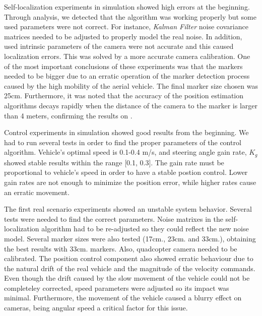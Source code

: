 \documentclass{styles/svproc}
\begin{document}
        Self-localization experiments in simulation showed high errors at the beginning. Through analysis, we detected that the algorithm was working properly but some used parameters were not correct. For instance, \textit{Kalman Filter} noise covariance matrices needed to be adjusted to properly model the real noise. In addition, used intrinsic parameters of the camera were not accurate and this caused localization errors. This was solved by a more accurate camera calibration. One of the most important conclusions of these experiments was that the markers needed to be bigger due to an erratic operation of the marker detection process caused by the high mobility of the aerial vehicle. The final marker size chosen was 25cm. Furthermore, it was noted that the accuracy of the position estimation algorithms decays rapidly when the distance of the camera to the marker is larger than 4 meters, confirming the results on \cite{lopezceron2016}.
	
	Control experiments in simulation showed good results from the beginning. We had to run several tests in order to find the proper parameters of the control algorithm. Vehicle's optimal speed is 0.1-0.4 m/s, and steering angle gain rate, $ K_{g}$ showed stable results within the range [0.1, 0.3]. The gain rate must be proportional to vehicle's speed in order to have a stable postion control. Lower gain rates are not enough to minimize the position error, while higher rates cause an erratic movement.
	
	The first real scenario experiments showed an unstable system behavior. Several tests were needed to find the correct parameters. Noise matrixes in the self-localization algorithm had to be re-adjusted so they could reflect the new noise model. Several marker sizes were also tested (17cm., 23cm.  and 33cm.), obtaining the best results with 33cm. markers. Also, quadcopter camera needed to be calibrated. The position control component also showed erratic behaviour due to the natural drift of the real vehicle and the magnitude of the velocity commands. Even though the drift caused by the slow movement of the vehicle could not be completeley corrected, speed parameters were adjusted so its impact was minimal. Furthermore, the movement of the vehicle caused a blurry effect on cameras, being angular speed a critical factor for this issue.
	
\end{document}
